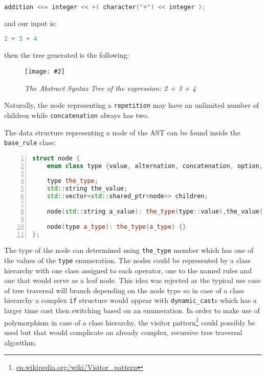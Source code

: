 \documentclass[12pt]{article}
\newcommand{\ufig}[3]{
	\begin{figure}[h!]
		\centering
			\texttt{[image: \#2]}
			\caption{\emph{#3}}
			\label{fig:#2}
	\end{figure}
}
\begin{document}
\begin{center}
	\begin{minipage}[h]{0.7\textwidth}
		\begin{lstlisting}[language=C++, breaklines=true]
addition <<= integer << +( character("+") << integer );
		\end{lstlisting}
	\end{minipage}
\end{center}

and our input is:

\begin{center}
	\begin{minipage}[h]{0.2\textwidth}
		\begin{lstlisting}[language=C++, breaklines=true]
2 + 3 + 4
		\end{lstlisting}
	\end{minipage}
\end{center}

then the tree generated is the following:

\ufig{0.5}{ast}{The Abstract Syntax Tree of the expression: 2 + 3 + 4}

Naturally, the node representing a \texttt{repetition} may have an unlimited number of children while
\texttt{concatenation} always has two.

The data structure representing a node of the AST can be found inside the \texttt{base\_rule} class:
\begin{center}
	\begin{minipage}[h]{0.9\textwidth}
		\begin{lstlisting}[language=C++, breaklines=true, numbers=left]
struct node {
	enum class type {value, alternation, concatenation, option, repetition, repetition_or_epsilon, named_rule};

	type the_type;
	std::string the_value;
	std::vector<std::shared_ptr<node>> children;

	node(std::string a_value): the_type(type::value),the_value(a_value) {}

	node(type a_type): the_type(a_type) {}
};
		\end{lstlisting}
	\end{minipage}
\end{center}

The type of the node can determined using \texttt{the\_type} member which has one of the values of the
\texttt{type} enumeration. The nodes could be represented by a class hierarchy with one class assigned to each
operator, one to the named rules and one that would serve as a leaf node. This idea was rejected as the
typical use case of tree traversal will branch depending on the node type so in case of a class hierarchy a
complex \texttt{if} structure would appear with \texttt{dynamic\_cast}s which has a larger time cost then
switching based on an enumeration. In order to make use of polymorphism in case of a class hierarchy, the
visitor
pattern\footnote{\href{http://en.wikipedia.org/wiki/Visitor_pattern}{en.wikipedia.org/wiki/Visitor\_pattern}}
could possibly be used but that would complicate an already complex, recursive tree traversal algorithm.
\end{document}
